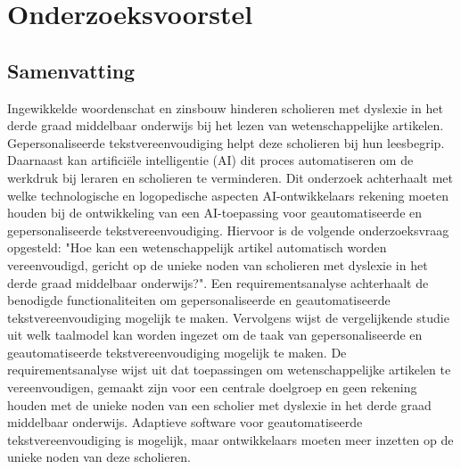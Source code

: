 \documentclass[dutch,dit,thesis]{hogentreport}
\begin{document}










\appendix

\chapter{Onderzoeksvoorstel}

\section*{Samenvatting}

Ingewikkelde woordenschat en zinsbouw hinderen scholieren met dyslexie in het derde graad middelbaar onderwijs bij het lezen van wetenschappelijke artikelen. Gepersonaliseerde tekstvereenvoudiging helpt deze scholieren bij hun leesbegrip. Daarnaast kan artificiële intelligentie (AI) dit proces automatiseren om de werkdruk bij leraren en scholieren te verminderen. Dit onderzoek achterhaalt met welke technologische en logopedische aspecten AI-ontwikkelaars rekening moeten houden bij de ontwikkeling van een AI-toepassing voor geautomatiseerde en gepersonaliseerde tekstvereenvoudiging. Hiervoor is de volgende onderzoeksvraag opgesteld: "Hoe kan een wetenschappelijk artikel automatisch worden vereenvoudigd, gericht op de unieke noden van scholieren met dyslexie in het derde graad middelbaar onderwijs?". Een requirementsanalyse achterhaalt de benodigde functionaliteiten om gepersonaliseerde en geautomatiseerde tekstvereenvoudiging mogelijk te maken. Vervolgens wijst de vergelijkende studie uit welk taalmodel kan worden ingezet om de taak van gepersonaliseerde en geautomatiseerde tekstvereenvoudiging mogelijk te maken. De requirementsanalyse wijst uit dat toepassingen om wetenschappelijke artikelen te vereenvoudigen, gemaakt zijn voor een centrale doelgroep en geen rekening houden met de unieke noden van een scholier met dyslexie in het derde graad middelbaar onderwijs. Adaptieve software voor geautomatiseerde tekstvereenvoudiging is mogelijk, maar ontwikkelaars moeten meer inzetten op de unieke noden van deze scholieren. 
\end{document}
